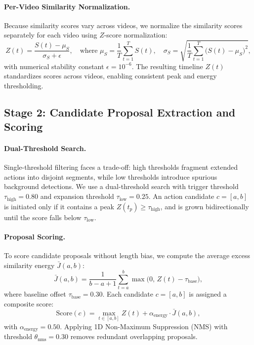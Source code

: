 \paragraph{Per-Video Similarity Normalization.} Because similarity scores vary across videos, we normalize the similarity scores separately for each video using $Z$-score normalization:
\begin{equation}
    Z(t) = \frac{S(t) - \mu_S}{\sigma_S + \epsilon}, \quad \text{where } \mu_S = \frac{1}{T}\sum_{t=1}^T S(t), \quad \sigma_S = \sqrt{\frac{1}{T}\sum_{t=1}^T \big(S(t) - \mu_S\big)^2},
    \label{eq:z_score}
\end{equation}
with numerical stability constant $\epsilon = 10^{-6}$. The resulting timeline $Z(t)$ standardizes scores across videos, enabling consistent peak and energy thresholding.


\subsection{Stage 2: Candidate Proposal Extraction and Scoring}
\label{sec:stage2}

\paragraph{Dual-Threshold Search.} Single-threshold filtering faces a trade-off: high thresholds fragment extended actions into disjoint segments, while low thresholds introduce spurious background detections. We use a dual-threshold search with trigger threshold $\tau_{\text{high}} = 0.80$ and expansion threshold $\tau_{\text{low}} = 0.25$. An action candidate $c = [a, b]$ is initiated only if it contains a peak $Z(t_p) \ge \tau_{\text{high}}$, and is grown bidirectionally until the score falls below $\tau_{\text{low}}$.

\paragraph{Proposal Scoring.} To score candidate proposals without length bias, we compute the average excess similarity energy $\bar{J}(a, b)$:
\begin{equation}
    \bar{J}(a, b) = \frac{1}{b - a + 1} \sum_{t=a}^{b} \max\big(0, \, Z(t) - \tau_{\text{base}}\big),
    \label{eq:excess_energy}
\end{equation}
where baseline offset $\tau_{\text{base}} = 0.30$. Each candidate $c = [a, b]$ is assigned a composite score:
\begin{equation}
    \mathrm{Score}(c) = \max_{t \in [a, b]} Z(t) + \alpha_{\text{energy}} \cdot \bar{J}(a, b),
    \label{eq:composite_score}
\end{equation}
with $\alpha_{\text{energy}} = 0.50$. Applying 1D Non-Maximum Suppression (NMS) with threshold $\theta_{\text{nms}} = 0.30$ removes redundant overlapping proposals.

